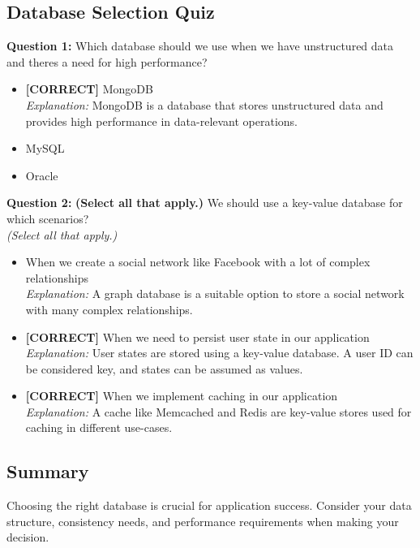 \documentclass[12pt,a4paper]{book}
\begin{document}
\subsection*{Database Selection Quiz}
\vspace{0.3cm}
\noindent
\textbf{Question 1:} Which database should we use when we have unstructured data and there\textquotesingle s a need for high performance?
\\[0.2cm]
\begin{itemize}
 \item \textbf{[CORRECT]} MongoDB
\\[0.1cm]
\textit{Explanation:} 
MongoDB is a database that stores unstructured data and provides high performance in data-relevant operations.
 \item MySQL
 \item Oracle
\end{itemize}
\vspace{0.3cm}
\noindent
\textbf{Question 2:} \textbf{(Select all that apply.)} We should use a key-value database for which scenarios?
\\
\textit{(Select all that apply.)}
\\[0.2cm]
\begin{itemize}
 \item When we create a social network like Facebook with a lot of complex relationships
\\[0.1cm]
\textit{Explanation:} 
A graph database is a suitable option to store a social network with many complex relationships.
 \item \textbf{[CORRECT]} When we need to persist user state in our application
\\[0.1cm]
\textit{Explanation:} 
User states are stored using a key-value database. A user ID can be considered key, and states can be assumed as values.
 \item \textbf{[CORRECT]} When we implement caching in our application
\\[0.1cm]
\textit{Explanation:} 
A cache like Memcached and Redis are key-value stores used for caching in different use-cases.
\end{itemize}

\subsection{Summary}\label{summary}

Choosing the right database is crucial for application success. Consider your data structure, consistency needs, and performance requirements when making your decision.
\end{document}
